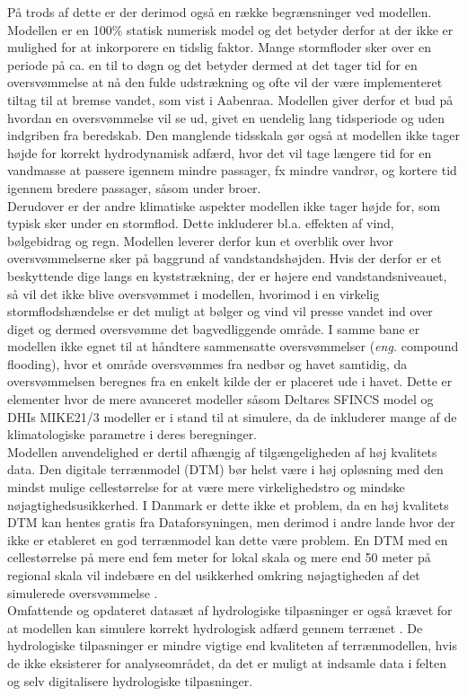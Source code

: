 På trods af dette er der derimod også en række begrænsninger ved modellen. Modellen er en 100\% statisk numerisk model og det betyder derfor at der ikke er mulighed for at inkorporere en tidslig faktor. Mange stormfloder sker over en periode på ca. en til to døgn og det betyder dermed at det tager tid for en oversvømmelse at nå den fulde udstrækning og ofte vil der være implementeret tiltag til at bremse vandet, som vist i Aabenraa. Modellen giver derfor et bud på hvordan en oversvømmelse vil se ud, givet en uendelig lang tidsperiode og uden indgriben fra beredskab. Den manglende tidsskala gør også at modellen ikke tager højde for korrekt hydrodynamisk adfærd, hvor det vil tage længere tid for en vandmasse at passere igennem mindre passager, fx mindre vandrør, og kortere tid igennem bredere passager, såsom under broer.\\

Derudover er der andre klimatiske aspekter modellen ikke tager højde for, som typisk sker under en stormflod. Dette inkluderer bl.a. effekten af vind, bølgebidrag og regn. Modellen leverer derfor kun et overblik over hvor oversvømmelserne sker på baggrund af vandstandshøjden. Hvis der derfor er et beskyttende dige langs en kyststrækning, der er højere end vandstandsniveauet, så vil det ikke blive oversvømmet i modellen, hvorimod i en virkelig stormflodshændelse er det muligt at bølger og vind vil presse vandet ind over diget og dermed oversvømme det bagvedliggende område. I samme bane er modellen ikke egnet til at håndtere sammensatte oversvømmelser (\textit{eng.} compound flooding), hvor et område oversvømmes fra nedbør og havet samtidig, da oversvømmelsen beregnes fra en enkelt kilde der er placeret ude i havet. 
Dette er elementer hvor de mere avanceret modeller såsom Deltares SFINCS model og DHIs MIKE21/3 modeller er i stand til at simulere, da de inkluderer mange af de klimatologiske parametre i deres beregninger.\\

Modellen anvendelighed er dertil afhængig af tilgængeligheden af høj kvalitets data. Den digitale terrænmodel (DTM) bør helst være i høj opløsning med den mindst mulige cellestørrelse \citep{seenath_effects_2018, williams_geographic_2022} for at være mere virkelighedstro og mindske nøjagtighedsusikkerhed. I Danmark er dette ikke et problem, da en høj kvalitets DTM kan hentes gratis fra Dataforsyningen, men derimod i andre lande hvor der ikke er etableret en god terrænmodel kan dette være problem. En DTM med en cellestørrelse på mere end fem meter for lokal skala og mere end 50 meter på regional skala vil indebære en del usikkerhed omkring nøjagtigheden af det simulerede oversvømmelse \citep{williams_geographic_2022}.\\
Omfattende og opdateret datasæt af hydrologiske tilpasninger er også krævet for at modellen kan simulere korrekt hydrologisk adfærd gennem terrænet \citep{bales_sources_2009}. De hydrologiske tilpasninger er mindre vigtige end kvaliteten af terrænmodellen, hvis de ikke eksisterer for analyseområdet, da det er muligt at indsamle data i felten og selv digitalisere hydrologiske tilpasninger.\\

